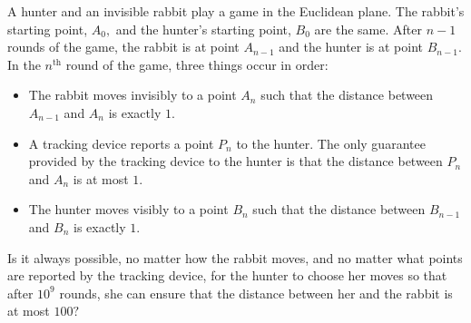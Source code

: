 A hunter and an invisible rabbit play a game in the Euclidean plane. The rabbit's starting point, $A_0,$ and the hunter's starting point, $B_0$ are the same. After $n-1$ rounds of the game, the rabbit is at point $A_{n-1}$ and the hunter is at point $B_{n-1}.$ In the $n^{\text{th}}$ round of the game, three things occur in order:

\begin{itemize}
	\item The rabbit moves invisibly to a point $A_n$ such that the distance between $A_{n-1}$ and $A_n$ is exactly $1.$
	\item A tracking device reports a point $P_n$ to the hunter. The only guarantee provided by the tracking device to the hunter is that the distance between $P_n$ and $A_n$ is at most $1.$
	\item The hunter moves visibly to a point $B_n$ such that the distance between $B_{n-1}$ and $B_n$ is exactly $1.$
\end{itemize}

Is it always possible, no matter how the rabbit moves, and no matter 
what points are reported by the tracking device, for the hunter to 
choose her moves so that after $10^9$ rounds, she can ensure that the distance between her and the rabbit is at most $100?$
